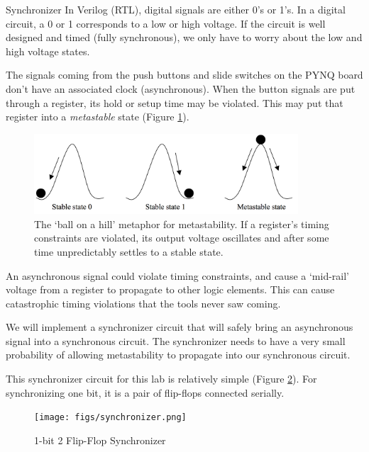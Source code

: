 \documentclass[11pt]{article}
\makeatletter
\renewcommand{\subsection}
{\@startsection {subsection}{1}{0pt}
 {-1ex}
 {0.5ex}
 {\bfseries\normalsize}}
\makeatother
\begin{document}
\subsection{Synchronizer}
In Verilog (RTL), digital signals are either 0's or 1's.
In a digital circuit, a 0 or 1 corresponds to a low or high voltage.
If the circuit is well designed and timed (fully synchronous), we only have to worry about the low and high voltage states.

The signals coming from the push buttons and slide switches on the PYNQ board don't have an associated clock (asynchronous).
When the button signals are put through a register, its hold or setup time may be violated.
This may put that register into a \textit{metastable} state (Figure \ref{fig:metastability}).

\begin{figure}
  \centerline{\includegraphics[height=3cm]{figs/metastability.png}}
  \caption{The `ball on a hill' metaphor for metastability. If a register's timing constraints are violated, its output voltage oscillates and after some time unpredictably settles to a stable state.}
  \label{fig:metastability}
\end{figure}

An asynchronous signal could violate timing constraints, and cause a `mid-rail' voltage from a register to propagate to other logic elements.
This can cause catastrophic timing violations that the tools never saw coming.

We will implement a synchronizer circuit that will safely bring an asynchronous signal into a synchronous circuit.
The synchronizer needs to have a very small probability of allowing metastability to propagate into our synchronous circuit.

This synchronizer circuit for this lab is relatively simple (Figure \ref{fig:synchronizer}).
For synchronizing one bit, it is a pair of flip-flops connected serially.

\begin{figure}[H]
  \vspace{0.5cm}
  \centerline{\texttt{[image: figs/synchronizer.png]}}
  \caption{1-bit 2 Flip-Flop Synchronizer}
  \label{fig:synchronizer}
\end{figure}
\end{document}
